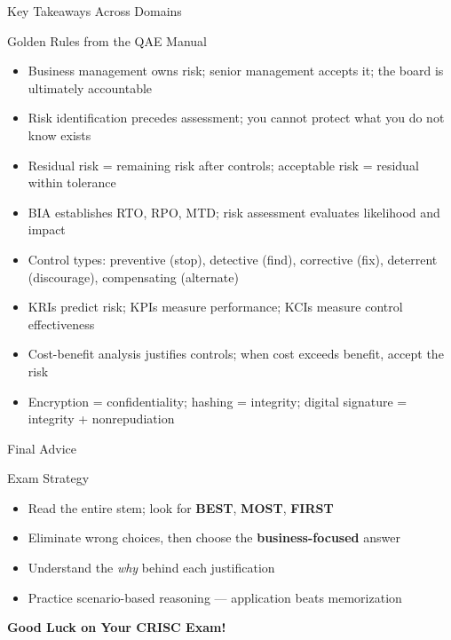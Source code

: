 \documentclass{beamer}
\begin{document}
	\begin{frame}{Key Takeaways Across Domains}
		\begin{block}{Golden Rules from the QAE Manual}
			\begin{itemize}
				\item Business management owns risk; senior management accepts it; the board is ultimately accountable
				\item Risk identification precedes assessment; you cannot protect what you do not know exists
				\item Residual risk = remaining risk after controls; acceptable risk = residual within tolerance
				\item BIA establishes RTO, RPO, MTD; risk assessment evaluates likelihood and impact
				\item Control types: preventive (stop), detective (find), corrective (fix), deterrent (discourage), compensating (alternate)
				\item KRIs predict risk; KPIs measure performance; KCIs measure control effectiveness
				\item Cost-benefit analysis justifies controls; when cost exceeds benefit, accept the risk
				\item Encryption = confidentiality; hashing = integrity; digital signature = integrity + nonrepudiation
			\end{itemize}
		\end{block}
	\end{frame}
	
	\begin{frame}{Final Advice}
		\begin{block}{Exam Strategy}
			\centering
			\vspace{0.3cm}
			\begin{itemize}
				\item Read the entire stem; look for \textbf{BEST}, \textbf{MOST}, \textbf{FIRST}
				\item Eliminate wrong choices, then choose the \textbf{business-focused} answer
				\item Understand the \textit{why} behind each justification
				\item Practice scenario-based reasoning --- application beats memorization
			\end{itemize}
			\par\vspace{0.5cm}
			\Large{\textbf{Good Luck on Your CRISC Exam!}}
		\end{block}
	\end{frame}
	
\end{document}
